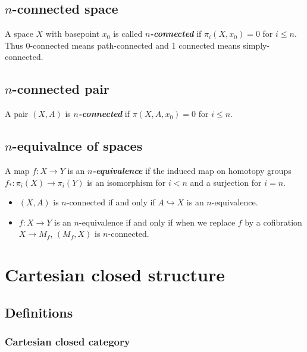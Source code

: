 \subsection{\texorpdfstring{$n$}{n}-connected space}

A space $X$ with basepoint $x_0$ is called \textbf{\textit{$n$-connected}} if $\pi_i(X,x_0)=0$ for $i\leq n$. Thus 0-connected means path-connected and 1 connected means simply-connected.

\subsection{\texorpdfstring{$n$}{n}-connected pair}

A pair $(X,A)$ is \textbf{\textit{$n$-connected}} if $\pi(X,A,x_0)=0$ for $i\leq n$.

\subsection{$n$-equivalnce of spaces}

A map $f:X\to Y$ is an \textit{\textbf{ $n$-equivalence}} if the induced map on homotopy groups $f_{*}:\pi_{i}(X)\to \pi_{i}(Y)$ is an isomorphism for $i<n$ and a surjection for $i=n$.

\begin{remark}\leavevmode
	\begin{itemize}
		\item $(X,A)$ is $n$-connected if and only if $A\hookrightarrow X$ is an $n$-equivalence.
		\item $f:X\to Y$ is an $n$-equivalence if and only if when we replace $f$ by a cofibration $X\to M_{f}$, $(M_{f},X)$ is $n$-connected.
	\end{itemize}
\end{remark}

\section*{Cartesian closed structure}

\subsection*{Definitions}

\subsubsection{Cartesian closed category}

